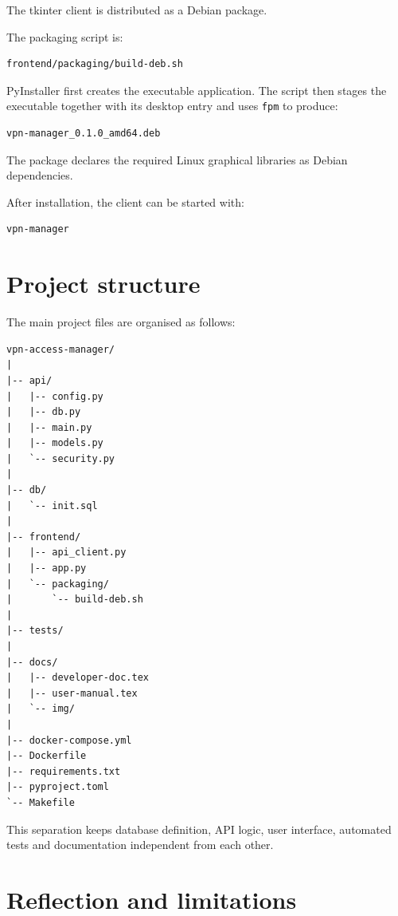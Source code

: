 \documentclass[11pt,a4paper]{article}
\begin{document}
The tkinter client is distributed as a Debian package.

The packaging script is:

\begin{verbatim}
frontend/packaging/build-deb.sh
\end{verbatim}

PyInstaller first creates the executable application. The script then stages
the executable together with its desktop entry and uses \texttt{fpm} to
produce:

\begin{verbatim}
vpn-manager_0.1.0_amd64.deb
\end{verbatim}

The package declares the required Linux graphical libraries as Debian
dependencies.

After installation, the client can be started with:

\begin{verbatim}
vpn-manager
\end{verbatim}

\section{Project structure}

The main project files are organised as follows:

\begin{verbatim}
vpn-access-manager/
|
|-- api/
|   |-- config.py
|   |-- db.py
|   |-- main.py
|   |-- models.py
|   `-- security.py
|
|-- db/
|   `-- init.sql
|
|-- frontend/
|   |-- api_client.py
|   |-- app.py
|   `-- packaging/
|       `-- build-deb.sh
|
|-- tests/
|
|-- docs/
|   |-- developer-doc.tex
|   |-- user-manual.tex
|   `-- img/
|
|-- docker-compose.yml
|-- Dockerfile
|-- requirements.txt
|-- pyproject.toml
`-- Makefile
\end{verbatim}

This separation keeps database definition, API logic, user interface,
automated tests and documentation independent from each other.

\section{Reflection and limitations}
\end{document}
